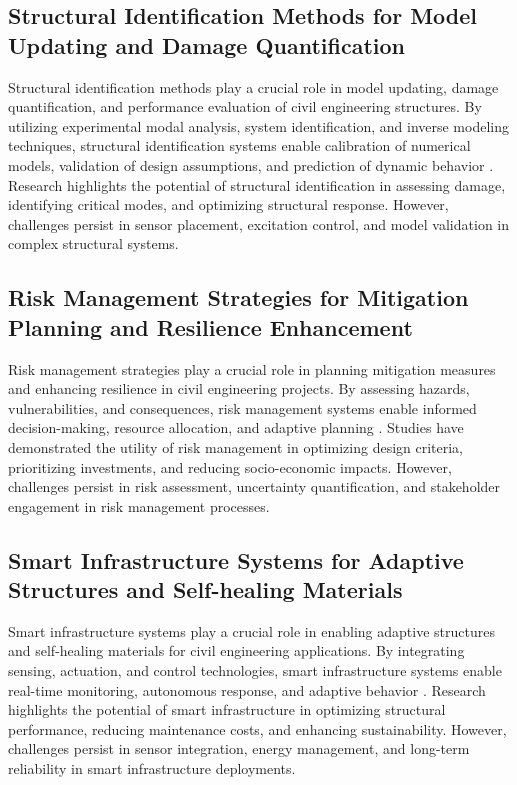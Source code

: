 \documentclass[journal, a4paper]{IEEEtran}
\begin{document}
\subsection{Structural Identification Methods for Model Updating and Damage Quantification}
Structural identification methods play a crucial role in model updating, damage quantification, and performance evaluation of
civil engineering structures. By utilizing experimental modal analysis, system identification, and inverse modeling techniques,
structural identification systems enable calibration of numerical models, validation of design assumptions, and prediction of
dynamic behavior \cite{zhang_defect_2020} \cite{wang_fatigue_2023} \cite{yifei_structure_2023}. Research highlights the potential of structural identification in assessing damage,
identifying critical modes, and optimizing structural response. However, challenges persist in sensor placement,
excitation control, and model validation in complex structural systems.

\subsection{Risk Management Strategies for Mitigation Planning and Resilience Enhancement}
Risk management strategies play a crucial role in planning mitigation measures and enhancing resilience in civil
engineering projects. By assessing hazards, vulnerabilities, and consequences, risk management systems enable informed 
decision-making, resource allocation, and adaptive planning \cite{zima_damage_2021} \cite{han_crack_2021} \cite{bevan_automated_2022}.
Studies have demonstrated the utility of risk management in optimizing design criteria,
prioritizing investments, and reducing socio-economic impacts. However, challenges persist in risk assessment,
uncertainty quantification, and stakeholder engagement in risk management processes.

\subsection{Smart Infrastructure Systems for Adaptive Structures and Self-healing Materials}
Smart infrastructure systems play a crucial role in enabling adaptive structures and self-healing
materials for civil engineering applications. By integrating sensing, actuation, and control technologies,
smart infrastructure systems enable real-time monitoring, autonomous response, and adaptive behavior \cite{wang_fatigue_2023} \cite{yifei_structure_2023} \cite{bevan_automated_2022}.
Research highlights the potential of smart infrastructure in optimizing structural performance, reducing maintenance costs,
and enhancing sustainability. However, challenges persist in sensor integration, energy management, and long-term reliability
in smart infrastructure deployments.
\end{document}
